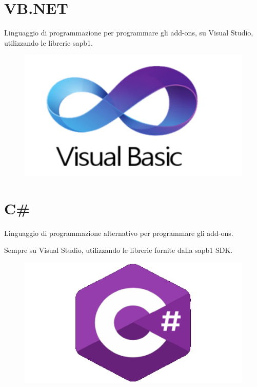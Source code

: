 \section{VB.NET}
Linguaggio di programmazione per programmare gli add-ons, su Visual Studio, utilizzando le librerie \gls{sapb1}.
\begin{figure}[!h] 
	\centering
	\includegraphics[scale = 0.4]{immagini/tecnologie/vb-header}
\end{figure}
\section{C\#}
\begin{flushleft}
	Linguaggio di programmazione alternativo per programmare gli add-ons.
	
	Sempre su Visual Studio, utilizzando le librerie fornite dalla \gls{sapb1} SDK.
\end{flushleft}
\begin{figure}[!h] 
	\centering
	\includegraphics[scale = 0.4]{immagini/tecnologie/csharp}
\end{figure}
